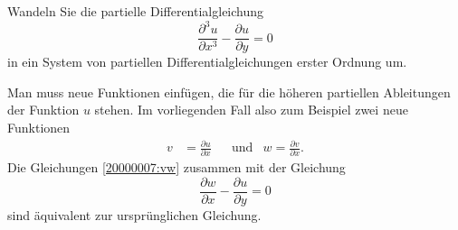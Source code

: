 Wandeln Sie die partielle Differentialgleichung
\[
\frac{\partial^3 u}{\partial x^3}-\frac{\partial u}{\partial y}=0
\]
in ein System von partiellen Differentialgleichungen erster Ordnung um.

\begin{loesung}
Man muss neue Funktionen einfügen, die für die höheren partiellen
Ableitungen der Funktion $u$ stehen. Im vorliegenden Fall also zum
Beispiel zwei neue Funktionen
\begin{align}
v&=\frac{\partial u}{\partial x}
&
&\text{und}&
w=\frac{\partial v}{\partial x}.
\label{20000007:vw}
\end{align}
Die Gleichungen \eqref{20000007:vw} zusammen mit der Gleichung
\[
\frac{\partial w}{\partial x}-\frac{\partial u}{\partial y}=0
\]
sind äquivalent zur ursprünglichen Gleichung.
\end{loesung}
